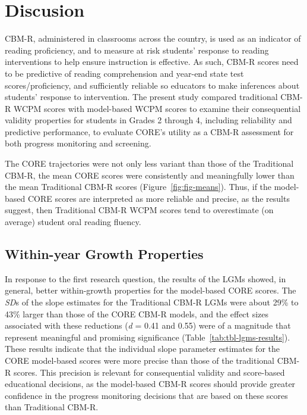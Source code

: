 \documentclass[
  english,
  man, fleqn, noextraspace]{apa6}
\begin{document}
\hypertarget{discusion}{%
\section{Discusion}\label{discusion}}

CBM-R, administered in classrooms across the country, is used as an indicator of reading proficiency, and to measure at risk students' response to reading interventions to help ensure instruction is effective. As such, CBM-R scores need to be predictive of reading comprehension and year-end state test scores/proficiency, and sufficiently reliable so educators to make inferences about students' response to intervention. The present study compared traditional CBM-R WCPM scores with model-based WCPM scores to examine their consequential validity properties for students in Grades 2 through 4, including reliability and predictive performance, to evaluate CORE's utility as a CBM-R assessment for both progress monitoring and screening.

The CORE trajectories were not only less variant than those of the Traditional CBM-R, the mean CORE scores were consistently and meaningfully lower than the mean Traditional CBM-R scores (Figure~\ref{fig:fig-means}). Thus, if the model-based CORE scores are interpreted as more reliable and precise, as the results suggest, then Traditional CBM-R WCPM scores tend to overestimate (on average) student oral reading fluency.

\hypertarget{within-year-growth-properties}{%
\subsection{Within-year Growth Properties}\label{within-year-growth-properties}}

In response to the first research question, the results of the LGMs showed, in general, better within-growth properties for the model-based CORE scores. The \emph{SD}s of the slope estimates for the Traditional CBM-R LGMs were about 29\% to 43\% larger than those of the CORE CBM-R models, and the effect sizes associated with these reductions (\emph{d} = 0.41 and 0.55) were of a magnitude that represent meaningful and promising significance (Table~\ref{tab:tbl-lgms-results}). These results indicate that the individual slope parameter estimates for the CORE model-based scores were more precise than those of the traditional CBM-R scores. This precision is relevant for consequential validity and score-based educational decisions, as the model-based CBM-R scores should provide greater confidence in the progress monitoring decisions that are based on these scores than Traditional CBM-R.
\end{document}
